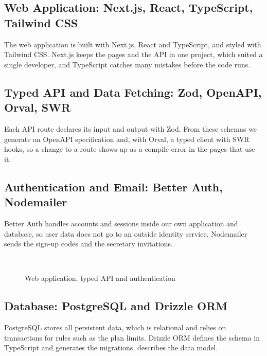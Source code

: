 \subsection{Web Application: Next.js, React, TypeScript, Tailwind CSS}
The web application is built with Next.js, React and TypeScript, and styled with Tailwind CSS. Next.js keeps the pages and the API in one project, which suited a single developer, and TypeScript catches many mistakes before the code runs.

\subsection{Typed API and Data Fetching: Zod, OpenAPI, Orval, SWR}
Each API route declares its input and output with Zod. From these schemas we generate an OpenAPI specification and, with Orval, a typed client with SWR hooks, so a change to a route shows up as a compile error in the pages that use it.

\subsection{Authentication and Email: Better Auth, Nodemailer}
Better Auth handles accounts and sessions inside our own application and database, so user data does not go to an outside identity service. Nodemailer sends the sign-up codes and the secretary invitations.

\begin{figure}[H]
    \centering
    \hfill
    \hfill
    \hfill
    \\[0.4cm]
    \hfill
    \hfill
    \hfill
    \caption{Web application, typed API and authentication}
    \label{fig:logos_web}
\end{figure}

\subsection{Database: PostgreSQL and Drizzle ORM}
PostgreSQL stores all persistent data, which is relational and relies on transactions for rules such as the plan limits. Drizzle ORM defines the schema in TypeScript and generates the migrations.  describes the data model.

